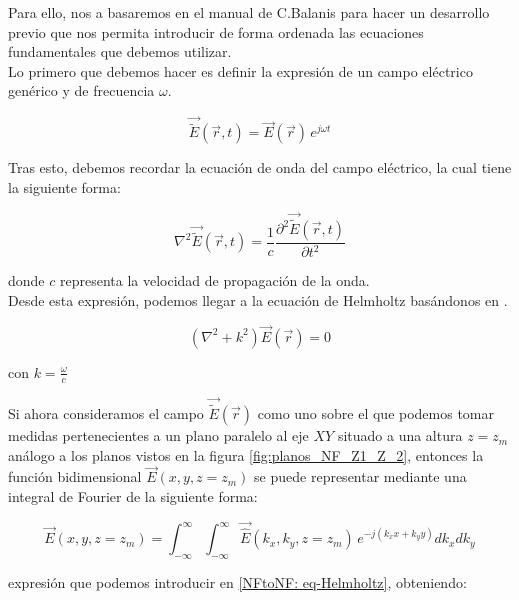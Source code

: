 Para ello, nos a basaremos en el manual de C.Balanis \autocite{Balanis_2016} para hacer un desarrollo previo que nos permita introducir de forma ordenada las ecuaciones fundamentales que debemos utilizar.
\\

Lo primero que debemos hacer es definir la expresión de un campo eléctrico genérico y de frecuencia $\omega$.

\begin{equation}
\vec{\tilde{E}}(\vec{r},t)=\vec{E}(\vec{r})\,e^{j\omega t}
\label{NFtoNF: eq-Campo E generico}
\end{equation}

Tras esto, debemos recordar la ecuación de onda del campo eléctrico, la cual tiene la siguiente forma:

\begin{equation}
\nabla^{2} \vec{\tilde{E}}(\vec{r},t)=\frac{1}{c}\frac{\partial^{2}
\vec{\tilde{E}}(\vec{r},t)}{\partial t^{2}}
\label{NFtoNF: eq-de-onde-campo-electrico}
\end{equation}

\noindent
donde $c$ representa la velocidad de propagación de la onda.\\

Desde esta expresión, podemos llegar a la ecuación de Helmholtz basándonos en \autocite{Pozar}.

\begin{equation}
(\nabla^{2}+k^{2})\vec{E}(\vec{r})=0
\label{NFtoNF: eq-Helmholtz}
\end{equation}

\noindent
con $k=\frac{\omega}{c}$

\newpage

Si ahora consideramos el campo $\vec{\tilde{E}}(\vec{r})$ como uno sobre el que podemos tomar medidas pertenecientes a un plano paralelo al eje $XY$ situado a una altura $z=z_{m}$ análogo a los planos vistos en la figura \ref{fig:planos_NF_Z1_Z_2}, entonces la función bidimensional $\vec{E}(x,y,z=z_{m})$ se puede representar
mediante una integral de Fourier de la siguiente forma:

\begin{equation}
\vec{E}(x,y,z=z_{m})=\int_{-\infty}^{\infty}\int_{-\infty}^{\infty}\vec{\hat{E}}(k_{x},k_{y},z=z_{m})
\,e^{-j (k_{x} x+k_{y} y)} dk_{x} dk_{y}
\label{NFtoNF: eq-fourier-campo-electrico}
\end{equation}

\noindent
expresión que podemos introducir en \eqref{NFtoNF: eq-Helmholtz}, obteniendo:

